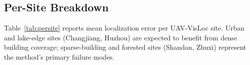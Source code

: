 \documentclass[10pt]{article}
\theoremstyle{plain}
\theoremstyle{definition}
\begin{document}
\begin{table}[htbp]
\end{table}

\subsection{Per-Site Breakdown}

Table~\ref{tab:persite} reports mean localization error per UAV-VisLoc site.
Urban and lake-edge sites (Changjiang, Huzhou) are expected to benefit from
dense building coverage; sparse-building and forested sites (Shandan, Zhuxi)
represent the method's primary failure modes.
\end{document}
